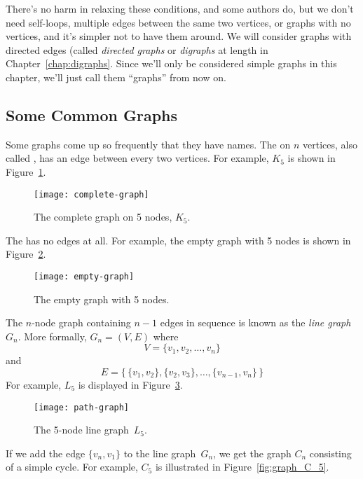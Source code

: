 There's no harm in relaxing these conditions, and some authors do, but
we don't need self-loops, multiple edges between the same two
vertices, or graphs with no vertices, and it's simpler not to have
them around.  We will consider graphs with directed edges (called
\emph{directed graphs} or \emph{digraphs} at length in
Chapter~\ref{chap:digraphs}.  Since we'll only be considered simple
graphs in this chapter, we'll just call them ``graphs'' from now on.


\subsection{Some Common Graphs}

Some graphs come up so frequently that they have names.  The
 on $n$ vertices, also called , has
an edge between every two vertices.  For example, $K_5$ is shown in
Figure~\ref{fig:K_5}.

\begin{figure}[h]
\texttt{[image: complete-graph]}
\caption{The complete graph on 5 nodes, $K_5$.}
\label{fig:K_5}
\end{figure}

The  has no edges at all.  For example, the empty
graph with 5 nodes is shown in Figure~\ref{fig:graph_empty_5}.

\begin{figure}[h]
\texttt{[image: empty-graph]}
\caption{The empty graph with 5 nodes.}
\label{fig:graph_empty_5}
\end{figure}

The $n$-node graph containing $n - 1$ edges in sequence is known as
the \emph{line graph}~$G_n$.  More formally, $G_n = (V, E)$ where
\begin{equation*}
    V = \{ v_1, v_2, \dots, v_n \}
\end{equation*}
and
\begin{equation*}
    E = \{\, \{ v_1, v_2 \}, \{ v_2, v_3 \}, \dots, \{ v_{n-1}, v_n \} \,\}
\end{equation*}
For example, $L_5$ is displayed in Figure~\ref{fig:graph_L_5}.

\begin{figure}[h]
\texttt{[image: path-graph]}
\caption{The 5-node line graph~$L_5$.}
\label{fig:graph_L_5}
\end{figure}

If we add the edge $\{v_n, v_1\}$ to the line graph~$G_n$, we get the
graph $C_n$ consisting of a simple cycle.  For example, $C_5$ is
illustrated in Figure~\ref{fig:graph_C_5}.

